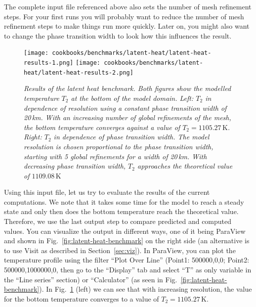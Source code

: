 \documentclass{article}
\begin{document}
The complete input file referenced above also sets the number of mesh refinement
steps. For your first runs you will probably want to reduce the number of mesh
refinement steps to make things run more quickly. Later on, you might also want
to change the phase transition width to look how this influences the result.

\begin{figure}
  \begin{center}
    \texttt{[image: cookbooks/benchmarks/latent-heat/latent-heat-results-1.png]}
    \hfill
    \texttt{[image: cookbooks/benchmarks/latent-heat/latent-heat-results-2.png]}
  \end{center}
  \caption{\it Results of the latent heat benchmark. Both figures show the modelled temperature $T_2$ at the bottom of the model domain.
      Left: $T_2$ in dependence of resolution using a constant phase transition width of 20\,km. With an increasing number of global refinements of the mesh, the bottom temperature converges against a value of $T_2 = 1105.27 \, \text{K}$.
      Right: $T_2$ in dependence of phase transition width. The model resolution is chosen proportional to the phase transition width, starting with 5 global refinements for a width of 20\,km. With decreasing phase transition width, $T_2$ approaches the theoretical value of $1109.08 \, \text{K}$}
  \label{fig:latent-heat-benchmark-results}
\end{figure}

Using this input file, let us try to evaluate the results of the current
computations. We note that it takes some time for the model to reach a steady
state and only then does the bottom temperature reach the theoretical value.
Therefore, we use the last output step to compare predicted and computed values.
You can visualize the output in different ways, one of it being ParaView and shown in
Fig.~\ref{fig:latent-heat-benchmark} on the right side (an alternative is to use Visit as
described in Section~\ref{sec:viz}). In ParaView, you can plot the temperature profile
using the filter ``Plot Over Line'' (Point1: 500000,0,0; Point2:
500000,1000000,0, then go to the ``Display'' tab and select ``T'' as only
variable in the ``Line series'' section) or ``Calculator'' (as seen in
Fig.~\ref{fig:latent-heat-benchmark}). In
Fig.~\ref{fig:latent-heat-benchmark-results} (left) we can see that with
increasing resolution, the value for the bottom temperature converges to a value
of $T_2 = 1105.27 \, \text{K}$. 
\end{document}

